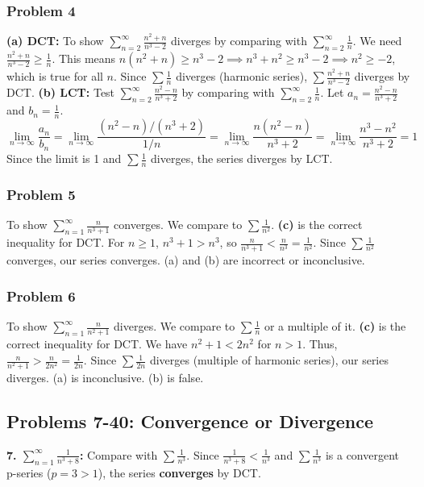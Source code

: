 \documentclass{article}
\begin{document}
\subsubsection*{Problem 4}
\textbf{(a) DCT:} To show \(\sum_{n=2}^{\infty} \frac{n^2+n}{n^3-2}\) diverges by comparing with \(\sum_{n=2}^{\infty} \frac{1}{n}\). We need \(\frac{n^2+n}{n^3-2} \geq \frac{1}{n}\). This means \(n(n^2+n) \geq n^3-2 \implies n^3+n^2 \geq n^3-2 \implies n^2 \geq -2\), which is true for all \(n\). Since \(\sum \frac{1}{n}\) diverges (harmonic series), \(\sum \frac{n^2+n}{n^3-2}\) diverges by DCT.
\textbf{(b) LCT:} Test \(\sum_{n=2}^{\infty} \frac{n^2-n}{n^3+2}\) by comparing with \(\sum_{n=2}^{\infty} \frac{1}{n}\). Let \(a_n = \frac{n^2-n}{n^3+2}\) and \(b_n = \frac{1}{n}\).
\[ \lim_{n \to \infty} \frac{a_n}{b_n} = \lim_{n \to \infty} \frac{(n^2-n)/(n^3+2)}{1/n} = \lim_{n \to \infty} \frac{n(n^2-n)}{n^3+2} = \lim_{n \to \infty} \frac{n^3-n^2}{n^3+2} = 1 \]
Since the limit is 1 and \(\sum \frac{1}{n}\) diverges, the series diverges by LCT.

\subsubsection*{Problem 5}
To show \(\sum_{n=1}^{\infty} \frac{n}{n^3+1}\) converges. We compare to \(\sum \frac{1}{n^2}\).
\textbf{(c)} is the correct inequality for DCT. For \(n \ge 1\), \(n^3+1 > n^3\), so \(\frac{n}{n^3+1} < \frac{n}{n^3} = \frac{1}{n^2}\). Since \(\sum \frac{1}{n^2}\) converges, our series converges. (a) and (b) are incorrect or inconclusive.

\subsubsection*{Problem 6}
To show \(\sum_{n=1}^{\infty} \frac{n}{n^2+1}\) diverges. We compare to \(\sum \frac{1}{n}\) or a multiple of it.
\textbf{(c)} is the correct inequality for DCT. We have \(n^2+1 < 2n^2\) for \(n>1\). Thus, \(\frac{n}{n^2+1} > \frac{n}{2n^2} = \frac{1}{2n}\). Since \(\sum \frac{1}{2n}\) diverges (multiple of harmonic series), our series diverges. (a) is inconclusive. (b) is false.

\subsection{Problems 7-40: Convergence or Divergence}
\textbf{7. \(\sum_{n=1}^{\infty} \frac{1}{n^3+8}\):} Compare with \(\sum \frac{1}{n^3}\). Since \(\frac{1}{n^3+8} < \frac{1}{n^3}\) and \(\sum \frac{1}{n^3}\) is a convergent p-series (\(p=3>1\)), the series \textbf{converges} by DCT.
\end{document}
